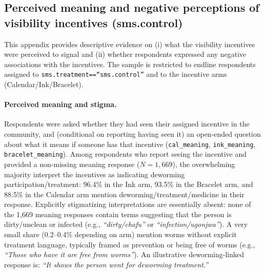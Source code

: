 \documentclass[12pt,a4paper]{article}
\begin{document}
  

\subsection{Perceived meaning and negative perceptions of visibility incentives (sms.control)}\label{app:bad_incentive}

This appendix provides descriptive evidence on (i) what the visibility incentives were perceived to signal and (ii) whether respondents expressed any negative associations with the incentives. The sample is restricted to endline respondents assigned to \texttt{sms.treatment==``sms.control''} and to the incentive arms (Calendar/Ink/Bracelet).

\paragraph{Perceived meaning and stigma.}
Respondents were asked whether they had seen their assigned incentive in the community, and (conditional on reporting having seen it) an open-ended question about what it means if someone has that incentive (\texttt{cal\_meaning}, \texttt{ink\_meaning}, \texttt{bracelet\_meaning}). Among respondents who report seeing the incentive and provided a non-missing meaning response ($N=1{,}669$), the overwhelming majority interpret the incentives as indicating deworming participation/treatment: 96.4\% in the Ink arm, 93.5\% in the Bracelet arm, and 88.5\% in the Calendar arm mention deworming/treatment/medicine in their response. Explicitly stigmatizing interpretations are essentially absent: none of the 1,669 meaning responses contain terms suggesting that the person is dirty/unclean or infected (e.g., \emph{``dirty/chafu''} or \emph{``infection/ugonjwa''}). A very small share (0.2--0.4\% depending on arm) mention worms without explicit treatment language, typically framed as prevention or being free of worms (e.g., \emph{``Those who have it are free from worms''}). An illustrative deworming-linked response is: \emph{``It shows the person went for deworming treatment.''}
\end{document}
